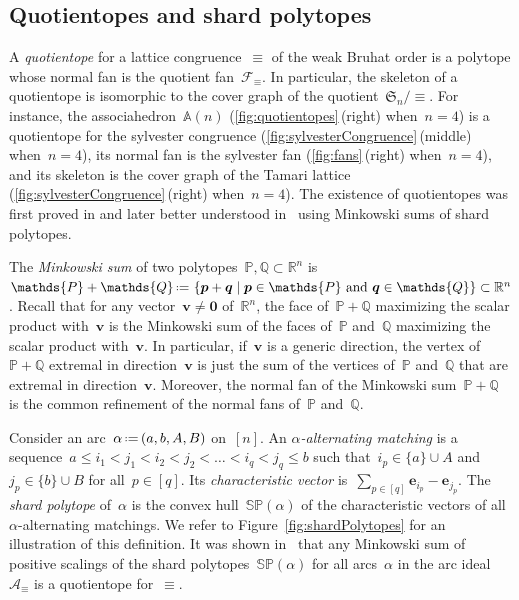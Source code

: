 \documentclass{amsart}
\theoremstyle{definition}
\newcommand{\R}{\mathbb{R}} %
\renewcommand{\c}[1]{\mathcal{#1}} %
\renewcommand{\b}[1]{{\boldsymbol{#1}}} %
\newcommand{\f}[1]{\mathfrak{#1}} %
\newcommand{\set}[2]{\left\{ #1 \;\middle|\; #2 \right\}} %
\newcommand{\eqdef}{\mbox{\,\raisebox{0.2ex}{\scriptsize\ensuremath{\mathrm:}}\ensuremath{=}\,}} %
\newcommand{\darkblue}{\color{darkblue}} %
\newcommand{\defn}[1]{\textsl{\darkblue #1}} %
\newcommand{\polytope}[1]{\mathds{#1}} %
\newcommand{\Asso}{\polytope{A}} %
\newcommand{\SP}{\polytope{SP}}
\begin{document}

\subsection{Quotientopes and shard polytopes}
\label{subsec:quotientopes}

A \defn{quotientope} for a lattice congruence~$\equiv$ of the weak Bruhat order is a polytope whose normal fan is the quotient fan~$\c{F}_\equiv$.
In particular, the skeleton of a quotientope is isomorphic to the cover graph of the quotient~$\f{S}_n/{\equiv}$.
For instance, the associahedron~$\Asso(n)$ (\cref{fig:quotientopes}\,(right) when~$n = 4$) is a quotientope for the sylvester congruence (\cref{fig:sylvesterCongruence}\,(middle) when~$n = 4$), its normal fan is the sylvester fan (\cref{fig:fans}\,(right) when~$n = 4$), and its skeleton is the cover graph of the Tamari lattice (\cref{fig:sylvesterCongruence}\,(right) when~$n = 4$).
The existence of quotientopes was first proved in \cite{MR3964495} and later better understood in~\cite{MR4584712} using Minkowski sums of shard polytopes.

The \defn{Minkowski sum} of two polytopes~$\polytope{P}, \polytope{Q} \subset \R^n$ is~$\polytope{P} + \polytope{Q} \eqdef \set{\b{p} + \b{q}}{\b{p} \in \polytope{P} \text{ and } \b{q} \in \polytope{Q}} \subset \R^n$.
Recall that for any vector~$\b{v} \ne \b{0}$ of~$\R^n$, the face of~$\polytope{P} + \polytope{Q}$ maximizing the scalar product with~$\b{v}$ is the Minkowski sum of the faces of~$\polytope{P}$ and~$\polytope{Q}$ maximizing the scalar product with~$\b{v}$.
In particular, if~$\b{v}$ is a generic direction, the vertex of~$\polytope{P} + \polytope{Q}$ extremal in direction~$\b{v}$ is just the sum of the vertices of~$\polytope{P}$ and~$\polytope{Q}$ that are extremal in direction~$\b{v}$.
Moreover, the normal fan of the Minkowski sum~$\polytope{P} + \polytope{Q}$ is the common refinement of the normal fans of~$\polytope{P}$ and~$\polytope{Q}$.

Consider an arc~$\alpha \eqdef (a, b, A, B)$ on~$[n]$.
An \defn{$\alpha$-alternating matching} is a sequence~$a \le i_1 < j_1 < i_2 < j_2 < \dots < i_q < j_q \le b$ such that~$i_p \in \{a\} \cup A$ and~$j_p \in \{b\} \cup B$ for all~$p \in [q]$.
Its \defn{characteristic vector} is~$\sum_{p \in [q]} \b{e}_{i_p} - \b{e}_{j_p}$.
The \defn{shard polytope} of~$\alpha$ is the convex hull~$\SP(\alpha)$ of the characteristic vectors of all $\alpha$-alternating matchings.
We refer to Figure~\ref{fig:shardPolytopes} for an illustration of this definition.
It was shown in~\cite{MR4584712} that any Minkowski sum of positive scalings of the shard polytopes~$\SP(\alpha)$ for all arcs~$\alpha$ in the arc ideal~$\c{A}_\equiv$ is a quotientope for~$\equiv$.
\end{document}
